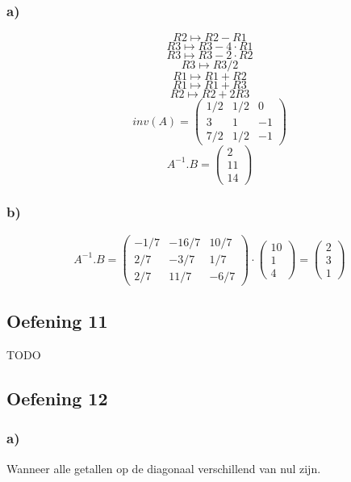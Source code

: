 \documentclass[lineaire_algebra_oplossingen.tex]{subfiles}
\begin{document}
\subsubsection*{a)}
\[R2 \longmapsto R2 - R1 \]
\[R3 \longmapsto R3 -4\cdot R1 \]
\[R3 \longmapsto R3 -2\cdot R2 \]
\[R3 \longmapsto R3/2 \]
\[R1 \longmapsto R1 + R2 \]
\[R1 \longmapsto R1 + R3 \]
\[R2 \longmapsto R2 + 2R3 \]
\[inv(A) = 
\begin{pmatrix}
1/2 & 1/2 & 0\\
3 & 1 & -1\\
7/2 & 1/2 & -1
\end{pmatrix}
\]
\[A^{-1}.B = 
\begin{pmatrix}
2\\
11\\
14
\end{pmatrix}
\]
\subsubsection*{b)}
\[A^{-1}.B = 
\begin{pmatrix}
-1/7 & -16/7 & 10/7\\
2/7 & -3/7 & 1/7\\
2/7 & 11/7 & -6/7
\end{pmatrix}
\cdot
\begin{pmatrix}
10\\
1\\
4
\end{pmatrix}
=
\begin{pmatrix}
2\\
3\\
1
\end{pmatrix}
\]

\subsection{Oefening 11}
TODO

\subsection{Oefening 12}
\subsubsection*{a)}
Wanneer alle getallen op de diagonaal verschillend van nul zijn.
\end{document}

